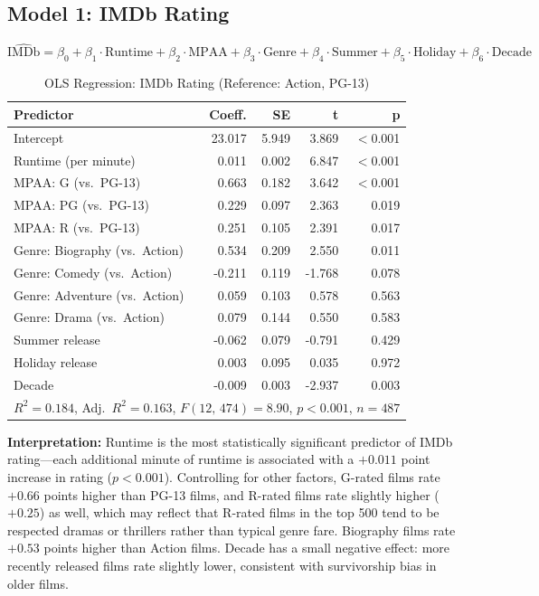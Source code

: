 \documentclass[11pt]{article}
\begin{document}
\subsection{Model 1: IMDb Rating}

\[
\widehat{\text{IMDb}} = \beta_0 + \beta_1 \cdot \text{Runtime} + \beta_2 \cdot \text{MPAA} + \beta_3 \cdot \text{Genre} + \beta_4 \cdot \text{Summer} + \beta_5 \cdot \text{Holiday} + \beta_6 \cdot \text{Decade}
\]

\begin{table}[H]
\centering
\caption{OLS Regression: IMDb Rating (Reference: Action, PG-13)}
\begin{tabular}{lrrrr}
\toprule
\textbf{Predictor} & \textbf{Coeff.} & \textbf{SE} & \textbf{t} & \textbf{p} \\
\midrule
Intercept                  & 23.017 & 5.949 &  3.869 & $<$0.001 \\
Runtime (per minute)       &  0.011 & 0.002 &  6.847 & $<$0.001 \\
MPAA: G (vs.\ PG-13)      &  0.663 & 0.182 &  3.642 & $<$0.001 \\
MPAA: PG (vs.\ PG-13)     &  0.229 & 0.097 &  2.363 & 0.019 \\
MPAA: R (vs.\ PG-13)      &  0.251 & 0.105 &  2.391 & 0.017 \\
Genre: Biography (vs.\ Action) &  0.534 & 0.209 &  2.550 & 0.011 \\
Genre: Comedy (vs.\ Action)   & -0.211 & 0.119 & -1.768 & 0.078 \\
Genre: Adventure (vs.\ Action) &  0.059 & 0.103 &  0.578 & 0.563 \\
Genre: Drama (vs.\ Action)    &  0.079 & 0.144 &  0.550 & 0.583 \\
Summer release             & -0.062 & 0.079 & -0.791 & 0.429 \\
Holiday release            &  0.003 & 0.095 &  0.035 & 0.972 \\
Decade                     & -0.009 & 0.003 & -2.937 & 0.003 \\
\midrule
\multicolumn{5}{l}{$R^2 = 0.184$, Adj.\ $R^2 = 0.163$, $F(12,\,474) = 8.90$, $p < 0.001$, $n = 487$} \\
\bottomrule
\end{tabular}
\end{table}

\textbf{Interpretation:} Runtime is the most statistically significant predictor of IMDb rating---each additional minute of runtime is associated with a $+0.011$ point increase in rating ($p < 0.001$). Controlling for other factors, G-rated films rate $+0.66$ points higher than PG-13 films, and R-rated films rate slightly higher ($+0.25$) as well, which may reflect that R-rated films in the top 500 tend to be respected dramas or thrillers rather than typical genre fare. Biography films rate $+0.53$ points higher than Action films. Decade has a small negative effect: more recently released films rate slightly lower, consistent with survivorship bias in older films.
\end{document}
